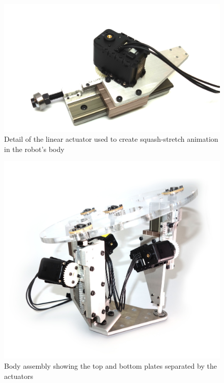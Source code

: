    \begin{figure}[thpb]
      \centering
      \includegraphics[width=4.6in]{figures/design/actuator.jpg}
      \caption{Detail of the linear actuator used to create squash-stretch animation in the robot's body}
      \label{fig_design_actuator}
   \end{figure}




   \begin{figure}[thpb]
      \centering
      \includegraphics[width=4.6in]{figures/design/body_assem2.jpeg}
      \caption{Body assembly showing the top and bottom plates separated by the actuators}
      \label{fig_design_body_assem}
   \end{figure}





